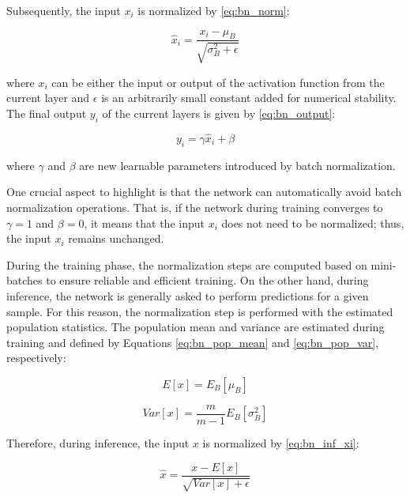 Subsequently, the input $x_i$ is normalized by \autoref{eq:bn_norm}:

\begin{equation}
\label{eq:bn_norm}
\hat{x}_i = \frac{x_i - \mu_B}{\sqrt{\sigma_B^{2} + \epsilon}}
\end{equation}

\noindent
where $x_i$ can be either the input or output of the activation function from the current layer and $\epsilon$ is an arbitrarily small constant added for numerical stability. The final output $y_i$ of the current layers is given by \autoref{eq:bn_output}:

\begin{equation}
\label{eq:bn_output}
y_i = \gamma\hat{x}_i + \beta
\end{equation}

\noindent
where $\gamma$ and $\beta$ are new learnable parameters introduced by batch normalization. 

One crucial aspect to highlight is that the network can automatically avoid batch normalization operations. That is, if the network during training converges to $\gamma=1$ and $\beta=0$, it means that the input $x_i$ does not need to be normalized; thus, the input $x_i$ remains unchanged.

During the training phase, the normalization steps are computed based on mini-batches to ensure reliable and efficient training. On the other hand, during inference, the network is generally asked to perform predictions for a given sample. For this reason, the normalization step is performed with the estimated population statistics. The population mean and variance are estimated during training and defined by Equations \ref{eq:bn_pop_mean} and \ref{eq:bn_pop_var}, respectively: 

\begin{equation}
\label{eq:bn_pop_mean}
E[x] = E_B[\mu_B]
\end{equation}

\begin{equation}
\label{eq:bn_pop_var}
Var[x] = \frac{m}{m-1} E_B[\sigma_B^{2}]
\end{equation}

Therefore, during inference, the input $x$ is normalized by \autoref{eq:bn_inf_xi}:

\begin{equation}
\label{eq:bn_inf_xi}
\hat{x} = \frac{x - E[x]}{\sqrt{Var[x] + \epsilon}}
\end{equation}

